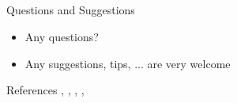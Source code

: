 \documentclass[compress]{beamer}
\begin{document}
	\subsection{ } %
	\begin{frame}{Questions and Suggestions}
		\begin{itemize}
			\item Any questions?
			\item Any suggestions, tips, ... are very welcome
		\end{itemize}
	\end{frame}
	\begin{frame}[shrink=30]{References}
		\cite{scatteringTransform2012}, \cite{InvariantScatteringTextureDiscrimination2013}, \cite{DeepRotoTranslation2014}, 
		\cite{ScalingTheScatteringTransform2017},
		\cite{3DScatteringTransformNeuro2017}
		
		\small
	\end{frame}
	
\end{document}
